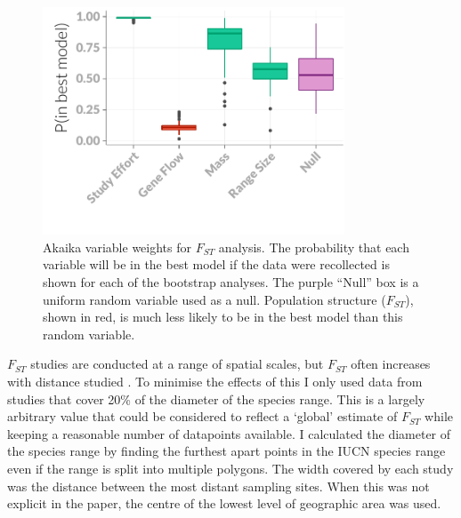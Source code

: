\begin{knitrout}\footnotesize
{}\color{fgcolor}\begin{figure}[t]

{\centering \includegraphics[width=0.8\textwidth]{figure/fstITPlots-1} 

}

\caption{Akaika variable weights for $F_{ST}$ analysis. The probability that each variable will be in the best model if the data were recollected is shown for each of the bootstrap analyses. The purple ``Null'' box is a uniform random variable used as a null. Population structure ($F_{ST}$), shown in red, is much less likely to be in the best model than this random variable.}\label{fig:fstITPlots}
\end{figure}


\end{knitrout}












$F_{ST}$ studies are conducted at a range of spatial scales, but $F_{ST}$ often increases with distance studied \cite{}.
To minimise the effects of this I only used data from studies that cover 20\% of the diameter of the species range.
This is a largely arbitrary value that could be considered to reflect a `global' estimate of $F_{ST}$ while keeping a reasonable number of datapoints available.
I calculated the diameter of the species range by finding the furthest apart points in the IUCN species range \cite{} even if the range is split into multiple polygons.
The width covered by each study was the distance between the most distant sampling sites.
When this was not explicit in the paper, the centre of the lowest level of geographic area was used.




